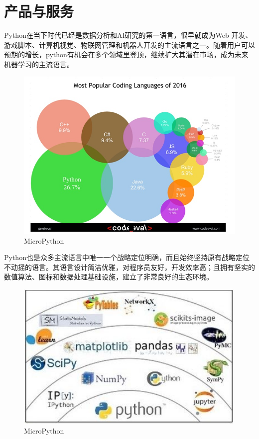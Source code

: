 ﻿\section{产品与服务}
Python在当下时代已经是数据分析和AI研究的第一语言，很早就成为Web 开发、游戏脚本、计算机视觉、物联网管理和机器人开发的主流语言之一。随着用户可以预期的增长，python有机会在多个领域里登顶，继续扩大其潜在市场，成为未来机器学习的主流语言。
\begin{figure}[H]
\centering
\includegraphics[width=12cm]{3_pythondatu.jpg}
\caption{MicroPython}
\label{MicroPython}
\end{figure}


Python也是众多主流语言中唯一一个战略定位明确，而且始终坚持原有战略定位不动摇的语言。其语言设计简洁优雅，对程序员友好，开发效率高；且拥有坚实的数值算法、图标和数据处理基础设施，建立了非常良好的生态环境。
\begin{figure}[H]
\centering
\includegraphics[width=12cm]{3_pythonquantu.jpg}
\caption{MicroPython}
\label{MicroPython}
\end{figure}






